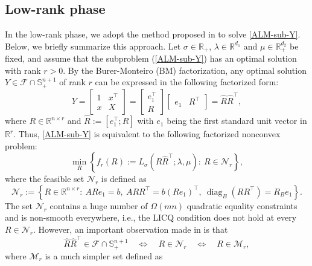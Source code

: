 \documentclass[11pt]{article}
\theoremstyle{plain}
\def\M{\mathcal{M}}
\def\F{\mathcal{F}}
\def\R{\mathbb{R}}
\def\N{\mathcal{N}}
\def\S{\mathbb{S}}
\def\hR{\widehat{R}}
\def\RR{{\widehat R\widehat R^\top}}
\begin{document}

\subsection{Low-rank phase}\label{subsec-LR-phase}

In the low-rank phase, we adopt the method proposed in \cite{RiNNAL} to solve \eqref{ALM-sub-Y}. Below, we briefly summarize this approach. Let $\sigma\in\R_+$, $\lambda\in \R^{d_1}$ and $\mu\in \R^{d_2}_+$ be fixed, and assume that the subproblem (\ref{ALM-sub-Y}) has an optimal solution with rank $r>0$. By the Burer-Monteiro (BM) factorization, any optimal solution $Y\in \mathcal{F}\cap \S_+^{n+1}$ of rank $r$ can be expressed in the following factorized form:
\begin{equation}\label{lr-R}
    Y=\begin{bmatrix}
        1 & x^{\top} \\
x & X
    \end{bmatrix}=\begin{bmatrix}
        e_1^{\top} \\
    R
    \end{bmatrix}
    \begin{bmatrix}
        e_1 & R^{\top}
    \end{bmatrix}=\RR,
\end{equation}
where $R\in \R^{n\times r}$ and $\hR:=[e_1^\top;R]$ with $e_1$ being the first standard unit vector in $\R^r$.
Thus, \eqref{ALM-sub-Y} is equivalent to the following factorized nonconvex problem: 
\begin{equation}
\label{ALM-sub-general-LR}
\min_R\left\{ 
f_r(R):=L_\sigma(\hR \hR^\top;\lambda,\mu)
:\ R\in \N_r \right\},
\end{equation}
where the feasible set $\N_r$ is defined as
\begin{equation*}
    \mathcal{N}_r :=  \left\{R\in\R^{n\times r} :\  ARe_1=b,\ ARR^\top=b(Re_1)^\top,\ \operatorname{diag}_B(RR^{\top})=R_B e_1 \right\}.
\end{equation*}
The set $\mathcal{N}_r$ contains a huge number of $\Omega(mn)$ quadratic equality constraints and is non-smooth everywhere, i.e., the LICQ condition does not hold at every $R\in \mathcal{N}_r$. However, an important observation made in \cite{RiNNAL} is that
\[
\hR\hR^\top \in\F\cap\S^{n+1}_+\quad\Longleftrightarrow\quad R\in \N_r\quad\Longleftrightarrow\quad R\in \M_r,
\]
where $\M_r$ is a much simpler set defined as
\end{document}
